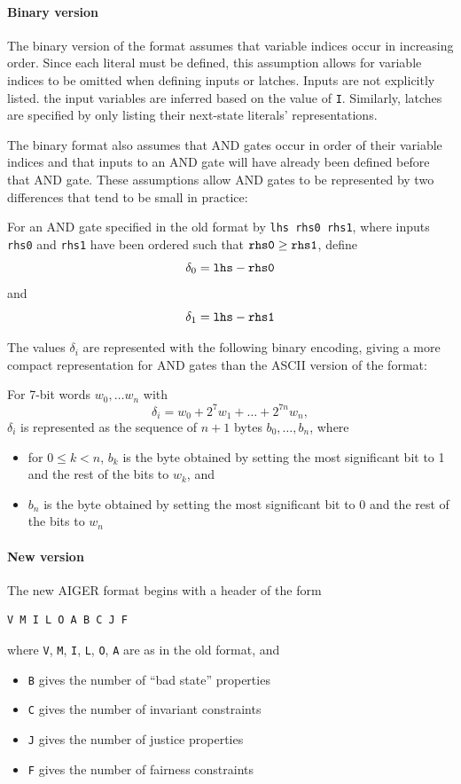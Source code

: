 \documentclass[12pt,a4paper,twoside,openright]{report}
\begin{document}
{\paragraph{Binary version}{
The binary version of the format assumes that variable indices
occur in increasing order. Since each literal must be defined, this assumption
allows for variable indices to be omitted when defining inputs or latches.
Inputs are not explicitly listed. the input variables are inferred based on
the value of \verb,I,.
Similarly, latches are specified by only listing their next-state literals'
representations.

The binary format also assumes that AND gates occur in order of their
variable indices and that inputs to an AND gate will
have already been defined before that AND gate.
These assumptions allow AND gates to be represented by two differences
that tend to be small in practice:

For an AND gate specified in the old format by \verb,lhs rhs0 rhs1,,
where inputs \verb,rhs0, and \verb,rhs1, have been ordered such that
$\verb,rhs0, \geq \verb,rhs1,$, define
$$\delta_0 = \verb,lhs, - \verb,rhs0,$$
and
$$\delta_1 = \verb,lhs, - \verb,rhs1,$$

The values $\delta_i$ are represented with the following binary
encoding, giving a more compact representation for AND gates than
the ASCII version of the format:

For 7-bit words $w_0, \ldots w_n$ with
$$\delta_i = w_0 + 2^7w_1 + \ldots + 2^{7n}w_n,$$
$\delta_i$ is represented as the sequence of $n + 1$ bytes
$b_0, \ldots, b_n$, where
\begin{itemize}
\item for $0 \leq k < n$, $b_k$ is the byte obtained by setting the most
significant bit to 1 and the rest of the bits to $w_k$, and
\item $b_n$ is the byte obtained by setting the most
significant bit to 0 and the rest of the bits to $w_n$
\end{itemize}}

\paragraph{New version} {
The new AIGER format begins with a header of the form
\begin{verbatim}
V M I L O A B C J F
\end{verbatim}
where \verb,V,, \verb,M,, \verb,I,, \verb,L,, \verb,O,, \verb,A, are as
in the old format, and
\begin{itemize}
\item \verb,B, gives the number of ``bad state'' properties
\item \verb,C, gives the number of invariant constraints
\item \verb,J, gives the number of justice properties
\item \verb,F, gives the number of fairness constraints
\end{itemize}

}}
\end{document}
